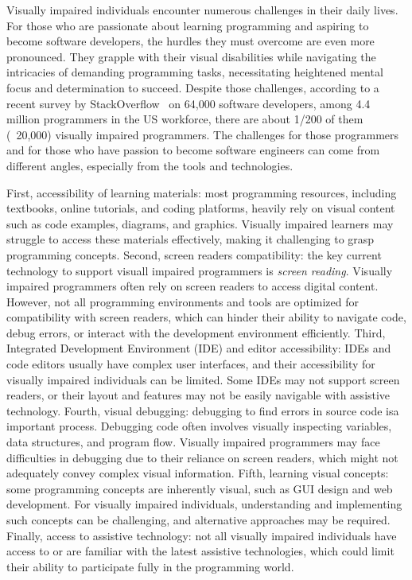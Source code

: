 
Visually impaired individuals encounter numerous challenges in their
daily lives. For those who are passionate about learning programming
and aspiring to become software developers, the hurdles they must
overcome are even more pronounced. They grapple with their visual
disabilities while navigating the intricacies of demanding programming
tasks, necessitating heightened mental focus and determination to
succeed. Despite those challenges, according to a recent survey by
StackOverflow~\cite{tien} on 64,000 software developers, among 4.4
million programmers in the US workforce, there are about 1/200 of them
(~20,000) visually impaired programmers. The challenges for
those programmers and for those who have passion to become software
engineers can come from different angles, especially from the tools
and technologies.

First, accessibility of learning materials: most programming
resources, including textbooks, online tutorials, and coding
platforms, heavily rely on visual content such as code examples,
diagrams, and graphics. Visually impaired learners may struggle to
access these materials effectively, making it challenging to grasp
programming concepts. Second, screen readers compatibility: the key
current technology to support visuall impaired programmers is {\em
screen reading}. Visually impaired programmers often rely on screen
readers to access digital content. However, not all programming
environments and tools are optimized for compatibility with screen
readers, which can hinder their ability to navigate code, debug
errors, or interact with the development environment efficiently.
Third, Integrated Development Environment (IDE) and editor
accessibility: IDEs and code editors usually have complex user
interfaces, and their accessibility for visually impaired individuals
can be limited. Some IDEs may not support screen readers, or their
layout and features may not be easily navigable with assistive
technology. Fourth, visual debugging: debugging to find errors in
source code isa important process. Debugging code often involves
visually inspecting variables, data structures, and program
flow. Visually impaired programmers may face difficulties in debugging
due to their reliance on screen readers, which might not adequately
convey complex visual information. Fifth, learning visual concepts:
some programming concepts are inherently visual, such as GUI design
and web development. For visually impaired individuals, understanding
and implementing such concepts can be challenging, and alternative
approaches may be required. Finally, access to assistive technology:
not all visually impaired individuals have access to or are familiar
with the latest assistive technologies, which could limit their
ability to participate fully in the programming world.

